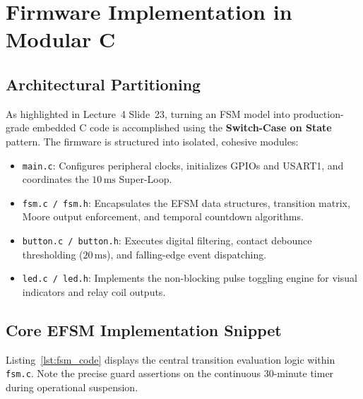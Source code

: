 \documentclass[12pt]{article}
\begin{document}
\section{Firmware Implementation in Modular C}

\subsection{Architectural Partitioning}
As highlighted in Lecture~4 Slide~23, turning an FSM model into production-grade embedded C code is accomplished using the \textbf{Switch-Case on State} pattern. The firmware is structured into isolated, cohesive modules:
\begin{itemize}
    \item \texttt{main.c}: Configures peripheral clocks, initializes GPIOs and USART1, and coordinates the $10\,\text{ms}$ Super-Loop.
    \item \texttt{fsm.c / fsm.h}: Encapsulates the EFSM data structures, transition matrix, Moore output enforcement, and temporal countdown algorithms.
    \item \texttt{button.c / button.h}: Executes digital filtering, contact debounce thresholding ($20\,\text{ms}$), and falling-edge event dispatching.
    \item \texttt{led.c / led.h}: Implements the non-blocking pulse toggling engine for visual indicators and relay coil outputs.
\end{itemize}

\subsection{Core EFSM Implementation Snippet}
Listing~\ref{lst:fsm_code} displays the central transition evaluation logic within \texttt{fsm.c}. Note the precise guard assertions on the continuous 30-minute timer during operational suspension.
\end{document}
